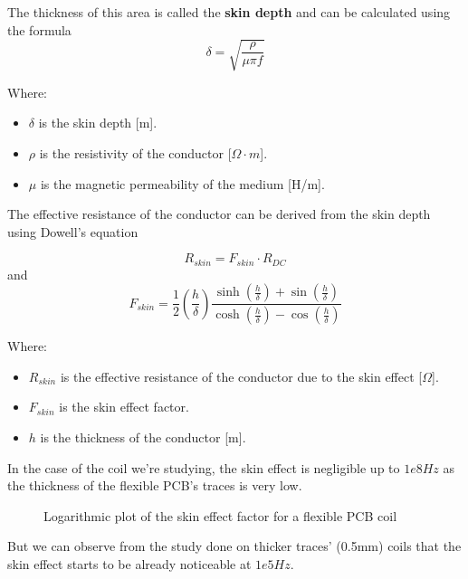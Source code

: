 \begin{itemize}
    The thickness of this area is called the \textbf{skin depth} and can be calculated using the formula
    \begin{equation}
        \delta = \sqrt{\frac{\rho}{\mu \pi f}}
    \end{equation}
            
    Where:
    \begin{itemize}
        \item \( \delta \) is the skin depth [m].
        \item \( \rho \) is the resistivity of the conductor [\(\Omega \cdot m\)].
        \item \( \mu \) is the magnetic permeability of the medium [H/m].
    \end{itemize}
    
    The effective resistance of the conductor can be derived from the skin depth using Dowell's equation

    \begin{equation}
        R_{skin} = F_{skin} \cdot R_{DC}
    \end{equation}
    and
    \begin{equation}
        F_{skin} = \frac{1}{2} (\frac{h}{\delta}) \frac{\sinh(\frac{h}{\delta}) + \sin(\frac{h}{\delta})}{\cosh(\frac{h}{\delta}) - \cos(\frac{h}{\delta})}
    \end{equation}

    Where:
    \begin{itemize}
        \item \( R_{skin} \) is the effective resistance of the conductor due to the skin effect [\(\Omega\)].
        \item \( F_{skin} \) is the skin effect factor.
        \item \( h \) is the thickness of the conductor [m].
    \end{itemize}

    In the case of the coil we're studying, the skin effect is negligible up to $1e8 Hz$ as the thickness of the flexible PCB's traces is very low.

    \begin{figure}
        \vfill
        
        \caption[Fskin of Flexar]{Logarithmic plot of the skin effect factor for a flexible PCB coil}
        \label{fig: Fskin of Flexar}
    \end{figure}

    But we can observe from the study done on thicker traces' (0.5mm) coils that the skin effect starts to be already noticeable at $1e5 Hz$.
    

\end{itemize}
